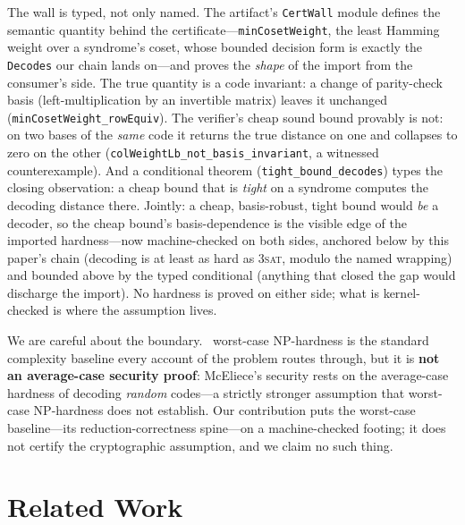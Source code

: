 \documentclass[sigplan,review,anonymous]{acmart}
\begin{document}
The wall is typed, not only named. The artifact's \lstinline{CertWall} module defines the semantic quantity
behind the certificate---\lstinline{minCosetWeight}, the least Hamming weight over a syndrome's coset, whose
bounded decision form is exactly the \lstinline{Decodes} our chain lands on---and proves the \emph{shape} of
the import from the consumer's side. The true quantity is a code invariant: a change of parity-check basis
(left-multiplication by an invertible matrix) leaves it unchanged (\lstinline{minCosetWeight_rowEquiv}). The
verifier's cheap sound bound provably is not: on two bases of the \emph{same} code it returns the true distance
on one and collapses to zero on the other (\lstinline{colWeightLb_not_basis_invariant}, a witnessed
counterexample). And a conditional theorem (\lstinline{tight_bound_decodes}) types the closing observation: a
cheap bound that is \emph{tight} on a syndrome computes the decoding distance there. Jointly: a cheap,
basis-robust, tight bound would \emph{be} a decoder, so the cheap bound's basis-dependence is the visible edge
of the imported hardness---now machine-checked on both sides, anchored below by this paper's chain (decoding is
at least as hard as \textsc{3sat}, modulo the named wrapping) and bounded above by the typed conditional
(anything that closed the gap would discharge the import). No hardness is proved on either side; what is
kernel-checked is where the assumption lives.

We are careful about the boundary.~\cite{BMvT78} worst-case NP-hardness is the standard complexity baseline
every account of the problem routes through, but it is \textbf{not an average-case security proof}: McEliece's
security rests on the average-case hardness of decoding \emph{random} codes---a strictly stronger assumption
that worst-case NP-hardness does not establish. Our contribution puts the worst-case baseline---its
reduction-correctness spine---on a machine-checked footing; it does not certify the cryptographic assumption,
and we claim no such thing.

\section{Related Work}\label{sec:related}
\end{document}
